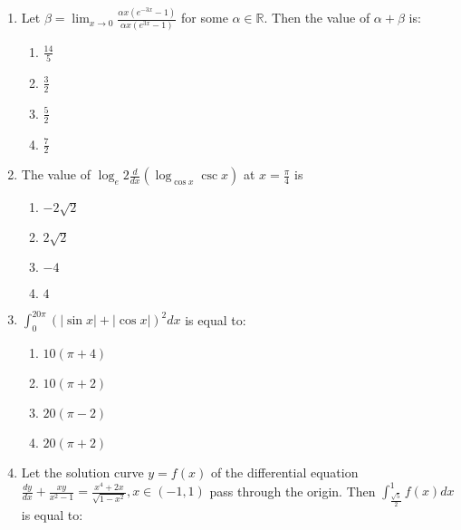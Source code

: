\documentclass[journal]{IEEEtran}
\newcommand{\brak}[1]{\left( #1 \right)}
\newcommand{\abs}[1]{\left| #1 \right|}
\begin{document}
\begin{enumerate}
    \item Let $\beta = \lim_{x \rightarrow 0} \frac{\alpha x \brak{e^{-3x} - 1}}{\alpha x \brak{e^{3x} - 1}}$ for some $\alpha \in \mathbb{R}$. Then the value of $\alpha + \beta$ is:

        \begin{multicols}{4}
        \begin{enumerate}
        \item $\frac{14}{5}$
        \item $\frac{3}{2}$
        \item $\frac{5}{2}$
        \item $\frac{7}{2}$
        \end{enumerate}
        \end{multicols}

   \item The value of $\log_{e} 2 \frac{d}{dx} \brak{\log_{\cos{x}} \csc{x}}$ at $x = \frac{\pi}{4}$ is

        \begin{multicols}{4}
        \begin{enumerate}
        \item $-2\sqrt{2}$
        \item $2\sqrt{2}$
        \item $-4$
        \item $4$
        \end{enumerate}
        \end{multicols}

    \item $\int_{0}^{20\pi} \brak{\abs{\sin{x}} + \abs{\cos{x}}}^{2} dx$ is equal to:

        \begin{multicols}{4}
        \begin{enumerate}
        \item $10 \brak{\pi + 4}$
        \item $10 \brak{\pi + 2}$
        \item $20 \brak{\pi - 2}$
        \item $20 \brak{\pi + 2}$
        \end{enumerate}
        \end{multicols}

    \item Let the solution curve $y = f \brak{x}$ of the differential equation $\frac{dy}{dx} + \frac{xy}{x^{2} - 1} = \frac{x^{4} + 2x}{\sqrt{1 - x^{2}}}, x \in \brak{-1, 1}$ pass through the origin. Then $\int_{\frac{\sqrt{5}}{2}}^{1} f \brak{x} dx$ is equal to:


\end{enumerate}
\end{document}
